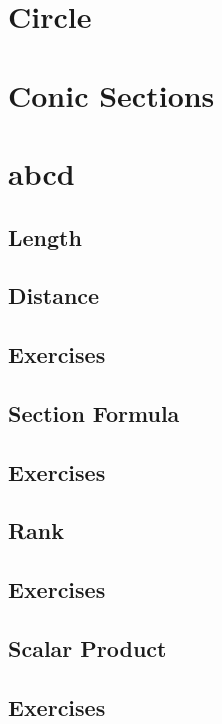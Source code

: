 \documentclass[11pt]{book}
\begin{document}
\chapter{Circle}

\chapter{Conic Sections}

\chapter{abcd}
%

\iffalse
\section{Length}

\section{Distance}

\section{Exercises}

\section{Section Formula}

\section{Exercises}

\section{Rank}

\section{Exercises}

\section{Scalar Product}

\section{Exercises}

\end{document}
